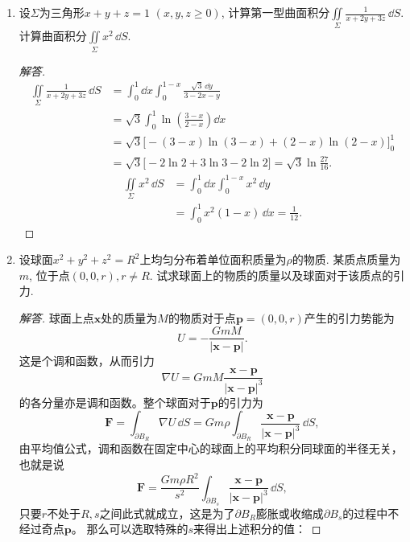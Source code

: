 \begin{quiza}
\begin{enumerate}
\item 设\(\varSigma\)为三角形\(x+y+z=1\) \((x,y,z\geqslant 0)\), 
计算第一型曲面积分\(\iint\limits_{\varSigma}\frac{1}{x+2y+3z}\,\dd S\). 
计算曲面积分\(\iint\limits_{\varSigma}x^2\,\dd S\).
\begin{proof}[解答]
\begin{align*}
\iint\limits_{\varSigma}\frac{1}{x+2y+3z}\,\dd S
&=\int_{0}^{1}\dd x\int_{0}^{1-x}\frac{\sqrt{3}\,\dd y}{3-2x-y}\\
&=\sqrt{3}\int_{0}^{1}\ln\left(\frac{3-x}{2-x}\right)\dd x\\
&=\sqrt{3}\big[\!-(3-x)\ln(3-x)+(2-x)\ln(2-x)\big]_0^1\\
&=\sqrt{3}\big[\!-2\ln 2+3\ln 3-2\ln 2\big]=\sqrt{3}\ln\frac{27}{16}.
\end{align*}\begin{align*}
\iint\limits_{\varSigma}x^2\,\dd S&=\int_{0}^{1}\dd x\int_{0}^{1-x}x^2\,\dd y\\
&=\int_{0}^{1}x^2(1-x)\,\dd x=\frac{1}{12}.
\end{align*}
\end{proof}

\item 设球面\(x^2+y^2+z^2=R^2\)上均匀分布着单位面积质量为\(\rho\)的物质. 
某质点质量为\(m\), 位于点\((0,0,r),r\ne R\). 
试求球面上的物质的质量以及球面对于该质点的引力.
\begin{proof}[解答]
球面上点$\boldsymbol{x}$处的质量为$M$的物质对于点$\boldsymbol{p}=(0,0,r)$产生的引力势能为
\[U=-\frac{GmM}{|\boldsymbol{x}-\boldsymbol{p}|}.\]
这是个调和函数，从而引力\[\nabla U=GmM\frac{\boldsymbol{x}-\boldsymbol{p}}{|\boldsymbol{x}-\boldsymbol{p}|^3}\]
的各分量亦是调和函数。整个球面对于$\boldsymbol{p}$的引力为
\[\boldsymbol{F}=\int_{\partial B_R}\nabla U\,\dd S=Gm\rho\int_{\partial B_R}\frac{\boldsymbol{x}-\boldsymbol{p}}{|\boldsymbol{x}-\boldsymbol{p}|^3}\,\dd S,\]
由平均值公式，调和函数在固定中心的球面上的平均积分同球面的半径无关，也就是说
\[\boldsymbol{F}=\frac{Gm\rho R^2}{s^2}\int_{\partial B_s}\frac{\boldsymbol{x}-\boldsymbol{p}}{|\boldsymbol{x}-\boldsymbol{p}|^3}\,\dd S,\]
只要$r$不处于$R,s$之间此式就成立，这是为了$\partial B_R$膨胀或收缩成$\partial B_s$的过程中不经过奇点$\boldsymbol{p}$。
那么可以选取特殊的$s$来得出上述积分的值：


\end{proof}
\end{enumerate}
\end{quiza}
